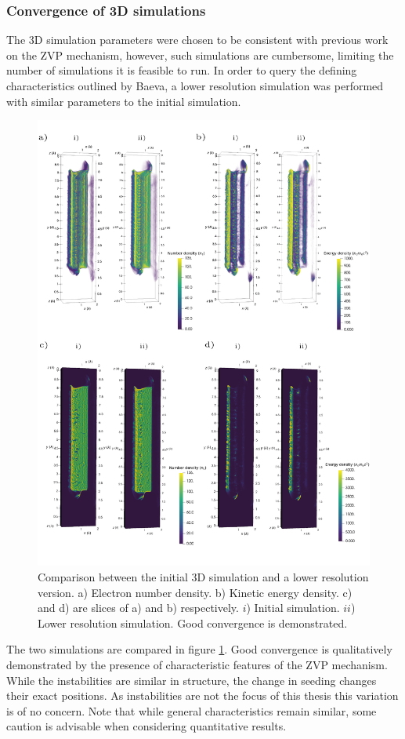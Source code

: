 \subsubsection{Convergence of 3D simulations}
The 3D simulation parameters were chosen to be consistent with previous work on the \ac{ZVP} mechanism, however, such simulations are cumbersome, limiting the number of simulations it is feasible to run. In order to query the defining characteristics outlined by Baeva, a lower resolution simulation was performed with similar parameters to the initial simulation.
\begin{figure}
	\centering
	\includegraphics[width=1\linewidth]{figures/zvp/zvp_3D_compare_lowres}
	\caption[Comparison between the initial 3D simulation and a lower resolution version.]{Comparison between the initial 3D simulation and a lower resolution version. a) Electron number density. b) Kinetic energy density. c) and d) are slices of a) and b) respectively. $i$) Initial simulation. $ii$) Lower resolution simulation. Good convergence is demonstrated.}
	\label{fig:zvp3dcomparelowres}
\end{figure}
The two simulations are compared in figure \ref{fig:zvp3dcomparelowres}. Good convergence is qualitatively demonstrated by the presence of characteristic features of the ZVP mechanism. While the instabilities are similar in structure, the change in seeding changes their exact positions. As instabilities are not the focus of this thesis this variation is of no concern. Note that while general characteristics remain similar, some caution is advisable when considering quantitative results.


